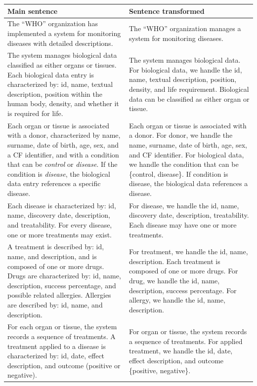 \documentclass[11pt,a4paper]{article}
\begin{document}
\begin{tabularx}{\textwidth}{|X|X|}
\hline
\textbf{Main sentence} & \textbf{Sentence transformed} \\
\hline
The ``WHO'' organization has implemented a system for monitoring diseases with detailed descriptions. &
The ``WHO'' organization manages a system for monitoring diseases. \\
\hline
The system manages biological data classified as either organs or tissues. Each biological data entry is characterized by: id, name, textual description, position within the human body, density, and whether it is required for life. &
The system manages biological data. For biological data, we handle the id, name, textual description, position, density, and life requirement. Biological data can be classified as either organ or tissue. \\
\hline
Each organ or tissue is associated with a donor, characterized by name, surname, date of birth, age, sex, and a CF identifier, and with a condition that can be \textit{control} or \textit{disease}. If the condition is \textit{disease}, the biological data entry references a specific disease. &
Each organ or tissue is associated with a donor. For donor, we handle the name, surname, date of birth, age, sex, and CF identifier. For biological data, we handle the condition that can be \{control, disease\}. If condition is disease, the biological data references a disease. \\
\hline
Each disease is characterized by: id, name, discovery date, description, and treatability. For every disease, one or more treatments may exist. &
For disease, we handle the id, name, discovery date, description, treatability. Each disease may have one or more treatments. \\
\hline
A treatment is described by: id, name, and description, and is composed of one or more drugs. Drugs are characterized by: id, name, description, success percentage, and possible related allergies. Allergies are described by: id, name, and description. &
For treatment, we handle the id, name, description. Each treatment is composed of one or more drugs. For drug, we handle the id, name, description, success percentage. For allergy, we handle the id, name, description. \\
\hline
For each organ or tissue, the system records a sequence of treatments. A treatment applied to a disease is characterized by: id, date, effect description, and outcome (positive or negative). &
For organ or tissue, the system records a sequence of treatments. For applied treatment, we handle the id, date, effect description, and outcome \{positive, negative\}. \\

\end{tabularx}
\end{document}
